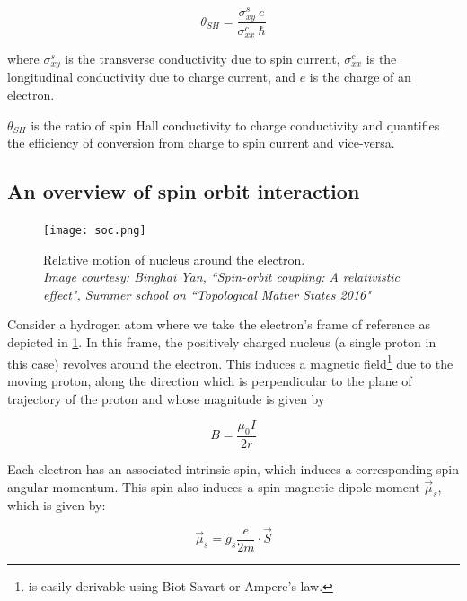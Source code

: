 \begin{equation} \label{eq:sha}
    \theta_{SH} = \frac{\sigma^s_{xy} \: e}{\sigma^c_{xx} \: \hbar}
\end{equation}

where \( \sigma^s_{xy} \) is the transverse conductivity due to spin current, \( \sigma^c_{xx} \) is the longitudinal conductivity due to charge current, and \( e \) is the charge of an electron.

\( \theta_{SH} \) is the ratio of spin Hall conductivity to charge conductivity and quantifies the efficiency of conversion from charge to spin current and vice-versa.

\subsection{An overview of spin orbit interaction}

\begin{figure}[h!]
    \centering
    \texttt{[image: soc.png]}
    \caption{Relative motion of nucleus around the electron.\\ \vspace{0.2cm} \textit{Image courtesy: Binghai Yan, ``Spin-orbit coupling: A relativistic effect", Summer school on ``Topological Matter States 2016"}}
    \label{fig:soc-atom}
\end{figure}

Consider a hydrogen atom where we take the electron's frame of reference as depicted in \cref{fig:soc-atom}.
In this frame, the positively charged nucleus (a single proton in this case) revolves around the electron.
This induces a magnetic field\footnote{ is easily derivable using Biot-Savart or Ampere's law.} due to the moving proton, along the direction which is perpendicular to the plane of trajectory of the proton and whose magnitude is given by

\begin{equation} \label{eq:B-field-ring}
    B = \frac{\mu_0 I}{2r}
\end{equation}

Each electron has an associated intrinsic spin, which induces a corresponding spin angular momentum.
This spin also induces a spin magnetic dipole moment \( \vec{\mu}_s \), which is given by:

\begin{equation} \label{eq:mu_sS}
    \vec{\mu}_s = g_s \frac{e}{2m} \cdot \vec{S}
\end{equation}

